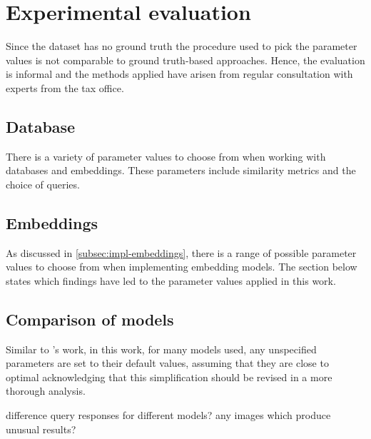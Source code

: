 \chapter{Experimental evaluation}\label{ch:evaluation}

Since the dataset has no ground truth the procedure used to pick the parameter values is not comparable to ground truth-based approaches.
Hence, the evaluation is informal and the methods applied have arisen from regular consultation with experts from the tax office.

 \section{Database}\label{sec:eval-db}
There is a variety of parameter values to choose from when working with databases and embeddings.
These parameters include similarity metrics and the choice of queries.

 

 

 
 
\section{Embeddings}\label{sec:eval-embeddings}
As discussed in \autoref{subsec:impl-embeddings}, there is a range of possible parameter values to choose from when implementing embedding models.
The section below states which findings have led to the parameter values applied in this work.

















\section{Comparison of models}\label{sec:evaluation-models}

Similar to \citeauthor{glove2014}'s work, in this work, for many models used, any unspecified parameters are set to their default values, 
assuming that they are close to optimal
acknowledging that this simplification should be revised in a more thorough analysis.

difference query responses for different models?
any images which produce unusual results?
